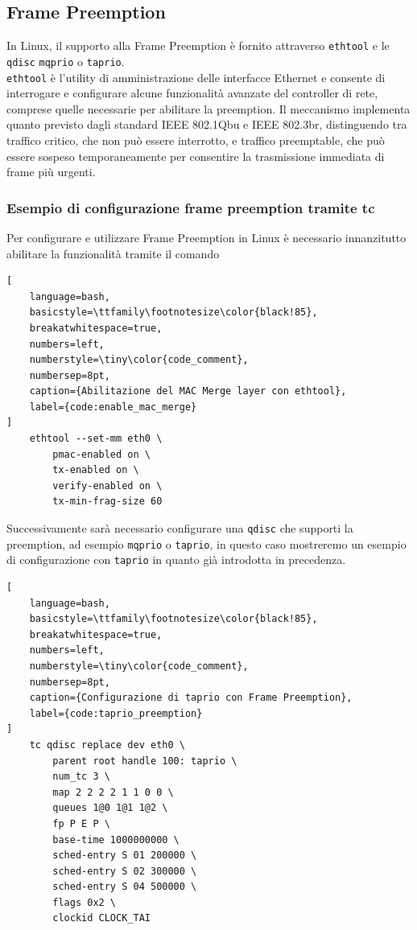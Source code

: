 \documentclass[12pt,a4paper,twoside]{book}
\begin{document}
\begin{onehalfspace}
\subsection{Frame Preemption}
In Linux, il supporto alla Frame Preemption è fornito attraverso \texttt{ethtool} e le \texttt{qdisc} \texttt{mqprio} o \texttt{taprio}.
\\
\texttt{ethtool} è l'utility di amministrazione delle interfacce Ethernet e consente di interrogare e configurare alcune funzionalità avanzate del controller di rete, comprese quelle necessarie per abilitare la preemption. Il meccanismo implementa quanto previsto dagli standard IEEE 802.1Qbu e IEEE 802.3br, distinguendo tra traffico critico, che non può essere interrotto, e traffico preemptable, che può essere sospeso temporaneamente per consentire la trasmissione immediata di frame più urgenti.

\subsubsection{Esempio di configurazione frame preemption tramite tc}
Per configurare e utilizzare Frame Preemption in Linux è necessario innanzitutto abilitare la funzionalità tramite il comando

\begin{lstlisting}[
    language=bash,
    basicstyle=\ttfamily\footnotesize\color{black!85},
    breakatwhitespace=true,
    numbers=left,
    numberstyle=\tiny\color{code_comment},
    numbersep=8pt,
    caption={Abilitazione del MAC Merge layer con ethtool},
    label={code:enable_mac_merge}
]
    ethtool --set-mm eth0 \
        pmac-enabled on \
        tx-enabled on \
        verify-enabled on \
        tx-min-frag-size 60
\end{lstlisting}

Successivamente sarà necessario configurare una \texttt{qdisc} che supporti la preemption, ad esempio \texttt{mqprio} o \texttt{taprio}, in questo caso mostreremo un esempio di configurazione con \texttt{taprio} in quanto già introdotta in precedenza.
\begin{lstlisting}[
    language=bash,
    basicstyle=\ttfamily\footnotesize\color{black!85},
    breakatwhitespace=true,
    numbers=left,
    numberstyle=\tiny\color{code_comment},
    numbersep=8pt,
    caption={Configurazione di taprio con Frame Preemption},
    label={code:taprio_preemption}
]
    tc qdisc replace dev eth0 \
        parent root handle 100: taprio \
        num_tc 3 \
        map 2 2 2 2 1 1 0 0 \
        queues 1@0 1@1 1@2 \
        fp P E P \
        base-time 1000000000 \
        sched-entry S 01 200000 \
        sched-entry S 02 300000 \
        sched-entry S 04 500000 \
        flags 0x2 \
        clockid CLOCK_TAI
\end{lstlisting}


\end{onehalfspace}
\end{document}
